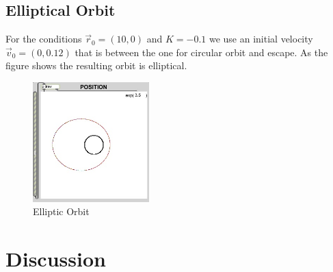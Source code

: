 \documentclass{article}
\begin{document}
\newpage

\subsection{Elliptical Orbit}
For the conditions $\overrightarrow{r}_0=(10,0)$ and $K=-0.1$ we use an initial velocity $\overrightarrow{v}_0=(0,0.12)$ that is between the one for circular orbit and escape.  As the figure shows the resulting orbit is elliptical.

\begin{figure}[h]
\begin{center}
\includegraphics[width=0.4\textwidth]{elliptic} %
\caption{Elliptic Orbit}
\end{center}
\end{figure}

\section{Discussion}










\end{document}
